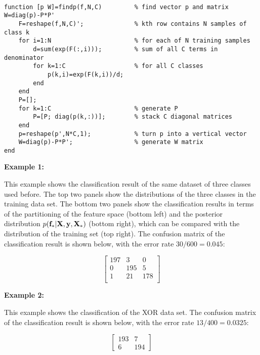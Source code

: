 \documentclass{article}
\begin{document}
\begin{verbatim}

function [p W]=findp(f,N,C)         % find vector p and matrix W=diag(p)-P*P'
    F=reshape(f,N,C)';              % kth row contains N samples of class k
    for i=1:N                       % for each of N training samples
        d=sum(exp(F(:,i)));         % sum of all C terms in denominator
        for k=1:C                   % for all C classes 
            p(k,i)=exp(F(k,i))/d;
        end
    end
    P=[];
    for k=1:C                       % generate P
        P=[P; diag(p(k,:))];        % stack C diagonal matrices
    end
    p=reshape(p',N*C,1);            % turn p into a vertical vector
    W=diag(p)-P*P';                 % generate W matrix
end

\end{verbatim}

{\bf Example 1:}

This example shows the classification result of the same dataset of
three classes used before. The top two panels show the distributions
of the three classes in the training data set. The bottom two panels
show the classification results in terms of the partitioning of the
feature space (bottom left) and the posterior distribution
$p({\bf f}_*|{\bf X},{\bf y},{\bf X}_*)$ (bottom right), which can be
compared with the distribution of the training set (top right). The 
confusion matrix of the classification result is shown below, with the
error rate $30/600=0.045$:

\begin{equation}
\left[\begin{array}{rrr} 
 197 &    3 &    0   \\
   0 &  195 &    5   \\
   1 &   21 &  178   \\
\end{array}\right]
\end{equation}

{\bf Example 2:}

This example shows the classification of the XOR data set. The confusion
matrix of the classification result is shown below, with the error rate 
$13/400=0.0325$:

\begin{equation}
\left[\begin{array}{rr} 
 193 &    7   \\
   6 &  194   
\end{array}\right]
\end{equation}
\end{document}
